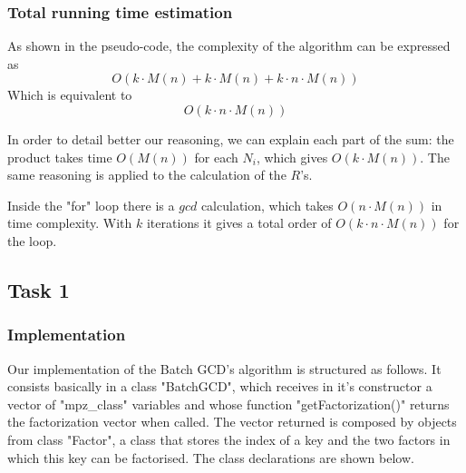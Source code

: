 \documentclass[a4paper,12pt]{article}
\begin{document}
%
%



\subsubsection{Total running time estimation}

As shown in the pseudo-code, the complexity of the algorithm can be expressed as $$O(k\cdot M(n) + k\cdot M(n) + k\cdot n\cdot M(n))$$
Which is equivalent to $$O(k\cdot n \cdot M(n))$$

In order to detail better our reasoning, we can explain each part of the sum: the product takes time $O(M(n))$ for each $N_i$, which gives $O(k\cdot M(n))$. The same reasoning is applied to the calculation of the $R$'s.

Inside the "for" loop there is a $gcd$ calculation, which takes $O(n \cdot M(n))$ in time complexity. With $k$ iterations it gives a total order of $O(k\cdot n \cdot M(n))$ for the loop.

\subsection{Task 1}
\subsubsection{Implementation}

Our implementation of the Batch GCD's algorithm is structured as follows. It consists basically in a class "BatchGCD", which receives in it's constructor a vector of "mpz\_class" variables and whose function "getFactorization()" returns the factorization vector when called. The vector returned is composed by objects from class "Factor", a class that stores the index of a key and the two factors in which this key can be factorised. The class declarations are shown below.
\end{document}
